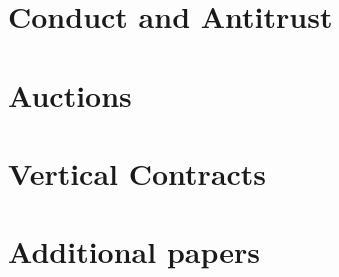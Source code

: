 \documentclass[12pt]{report}
\begin{document}
\chapter{Conduct and Antitrust}


\chapter{Auctions}


\chapter{Vertical Contracts}


\chapter{Additional papers}

\end{document}
